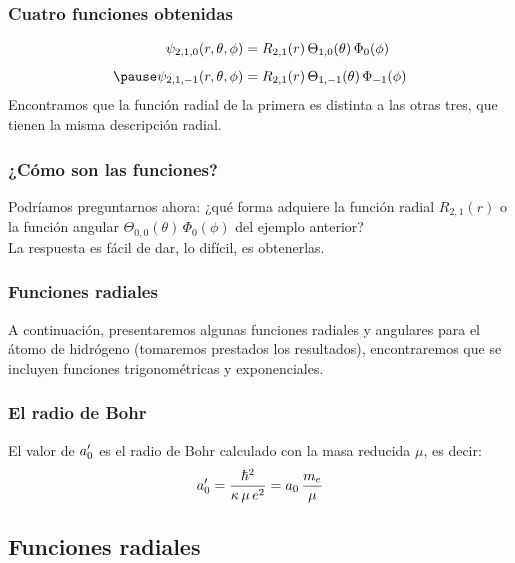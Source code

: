 \documentclass[12pt]{beamer}
\begin{document}
\begin{frame}
\frametitle{Cuatro funciones obtenidas}
\begin{eqnarray*}
\begin{aligned}
\psi_{2, 1, 0} (r, \theta, \phi) &= R_{2, 1} (r) \, \Theta_{1, 0} (\theta) \, \Phi_{0} (\phi) \\[0.5em] \pause
\psi_{2, 1, -1} (r, \theta, \phi) &= R_{2, 1} (r) \, \Theta_{1, -1} (\theta) \, \Phi_{-1} (\phi)
\end{aligned}
\end{eqnarray*}
Encontramos que la función radial de la primera es distinta a las otras tres, que tienen la misma descripción radial.
\end{frame}
\begin{frame}
\frametitle{¿Cómo son las funciones?}
Podríamos preguntarnos ahora: ¿qué forma adquiere la función radial $R_{2, 1} (r)$ \pause o la función angular $\Theta_{0, 0} (\theta) \, \Phi_{0} (\phi)$ del ejemplo anterior? 
\\
\bigskip
\pause
La respuesta es fácil de dar, lo difícil, es obtenerlas.
\end{frame}
\begin{frame}
\frametitle{Funciones radiales}
A continuación, presentaremos algunas funciones radiales  y angulares para el átomo de hidrógeno (tomaremos prestados los resultados), encontraremos que se incluyen funciones trigonométricas y exponenciales.
\end{frame}
\begin{frame}
\frametitle{El radio de Bohr}
El valor de ${a}^{\prime}_{0}$ es el radio de Bohr calculado con la masa reducida $\mu$, es decir:
\pause
\begin{align}
{a}^{\prime}_{0} = \dfrac{\hbar^{2}}{\kappa \, \mu \, e^{2}} = a_{0} \, \dfrac{m_{e}}{\mu}
\label{eq:ecuacion_07_27}
\end{align}
\end{frame}

\subsection*{Funciones radiales}
\end{document}
